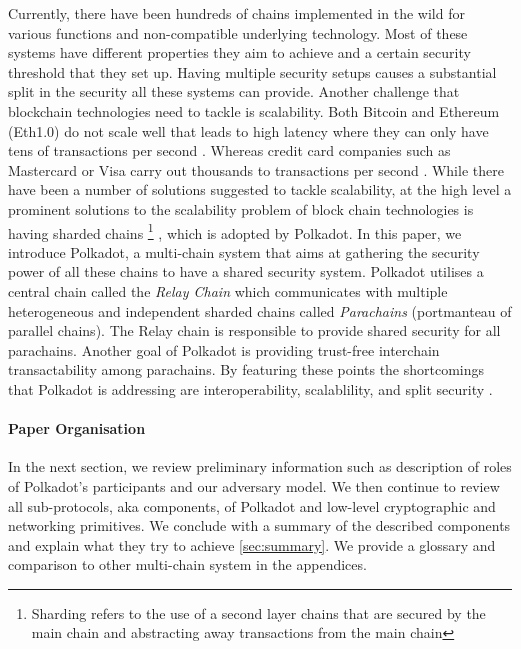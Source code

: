 Currently, there have been hundreds of chains implemented in the wild for various functions and non-compatible underlying technology. Most of these systems have different properties they aim to achieve and a certain security threshold that they set up. Having multiple security setups causes a substantial split in the security all these systems can provide. Another challenge that blockchain technologies need to tackle is scalability. Both Bitcoin and Ethereum (Eth1.0) do not scale well that leads to high latency where they can only have tens of transactions per second \cite{scaling}. Whereas credit card companies such as Mastercard or Visa carry out thousands to transactions per second \cite{}. While there have been a number of solutions suggested to tackle scalability, at the high level a prominent solutions to the scalability problem of block chain technologies is having sharded chains \footnote{Sharding refers to the use of a second layer chains that are secured by the main chain and abstracting away transactions from the main chain} \cite{sharding}, which is adopted by Polkadot. %
In this paper, we introduce Polkadot, a multi-chain system that aims at gathering the security power of all these chains to have a shared security system. Polkadot utilises a central chain called the \emph{Relay Chain} which communicates with multiple heterogeneous and independent sharded chains called \emph{Parachains} (portmanteau of parallel chains). The Relay chain is responsible to provide shared security for all parachains. Another goal of Polkadot is providing trust-free interchain transactability among parachains. By featuring these points the shortcomings that Polkadot is addressing are interoperability, scalablility, and split security .

\paragraph{Paper Organisation} In the next section, we review preliminary information such as description of roles of Polkadot's participants and our adversary model. We then continue to review all sub-protocols, aka components, of Polkadot and low-level cryptographic and networking primitives. We conclude with a summary of the described components and explain what they try to achieve \ref{sec:summary}. We provide a glossary and comparison to other multi-chain system in the appendices. 

